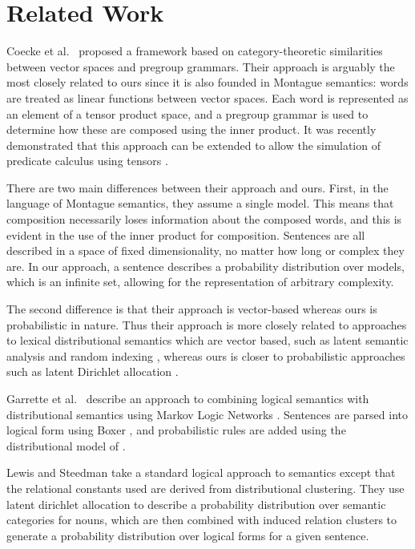 \documentclass{svmult}
\begin{document}

\section{Related Work}


Coecke et al.~\cite{Coecke:10} proposed a framework based on category-theoretic
similarities between vector spaces and pregroup grammars. Their
approach is arguably the most closely related to ours since it is also
founded in Montague semantics: words are treated as linear functions
between vector spaces. Each word is represented as an element of a
tensor product space, and a pregroup grammar is used to determine how
these are composed using the inner product. It was recently
demonstrated that this approach can be extended to allow the
simulation of predicate calculus using
tensors \cite{Grefenstette:13}.

There are two main differences between their approach and ours. First,
in the language of Montague semantics, they assume a single
model. This means that composition necessarily loses information about
the composed words, and this is evident in the use of the inner
product for composition. Sentences are all described in a space of
fixed dimensionality, no matter how long or complex they are. In our
approach, a sentence describes a probability distribution over models,
which is an infinite set, allowing for the representation of arbitrary
complexity.

The second difference is that their approach is vector-based whereas
ours is probabilistic in nature. Thus their approach is more
closely related to approaches to lexical distributional semantics
which are vector based, such as latent semantic analysis
\cite{Deerwester:90} and random indexing \cite{Sahlgren:02}, whereas
ours is closer to probabilistic approaches such as latent Dirichlet
allocation \cite{Blei:03}.

Garrette et al.~\cite{Garrette:11} describe an approach to combining logical
semantics with distributional semantics using Markov Logic Networks
\cite{Richardson:06}. Sentences are parsed into logical form using
Boxer \cite{Bos:04}, and probabilistic rules are added using the
distributional model of \cite{Erk:10}.

Lewis and Steedman \cite{Lewis:13} take a standard logical approach to
semantics except that the relational constants used are derived from
distributional clustering. They use latent dirichlet allocation to
describe a probability distribution over semantic categories for
nouns, which are then combined with induced relation clusters to
generate a probability distribution over logical forms for a given
sentence.
\end{document}
